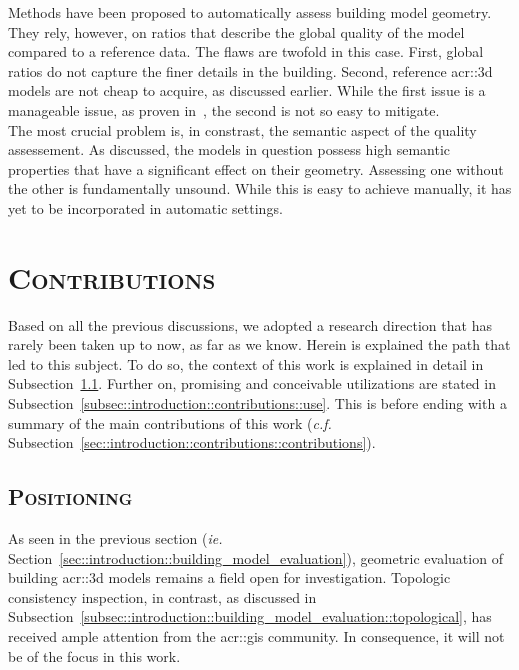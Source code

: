             Methods have been proposed to automatically assess building model geometry.
            They rely, however, on ratios that describe the global quality of the model compared to a reference data.
            The flaws are twofold in this case.
            First, global ratios do not capture the finer details in the building.
            Second, reference \gls{acr::3d} models are not cheap to acquire, as discussed earlier.
            While the first issue is a manageable issue, as proven in~\textcite{rottensteiner2012isprs}, the second is not so easy to mitigate.\\

            The most crucial problem is, in constrast, the semantic aspect of the quality assessement.
            As discussed, the models in question possess high semantic properties that have a significant effect on their geometry.
            Assessing one without the other is fundamentally unsound.
            While this is easy to achieve manually, it has yet to be incorporated in automatic settings.
\section{\textsc{Contributions}}
    \label{sec::introduction::contributions}
    Based on all the previous discussions, we adopted a research direction that has rarely been taken up to now, as far as we know.
    Herein is explained the path that led to this subject.
    To do so, the context of this work is explained in detail in Subsection~\ref{subsec::introduction::contributions::positioning}.
    Further on, promising and conceivable utilizations are stated in Subsection~\ref{subsec::introduction::contributions::use}.
    This is before ending with a summary of the main contributions of this work (\textit{c.f.} Subsection~\ref{sec::introduction::contributions::contributions}).
    
    \subsection{\textsc{Positioning}}
        \label{subsec::introduction::contributions::positioning}
        As seen in the previous section (\textit{ie.} Section~\ref{sec::introduction::building_model_evaluation}), geometric evaluation of building \gls{acr::3d} models remains a field open for investigation.
        Topologic consistency inspection, in contrast, as discussed in Subsection~\ref{subsec::introduction::building_model_evaluation::topological}, has received ample attention from the \gls{acr::gis} community.
        In consequence, it will not be of the focus in this work.\\


